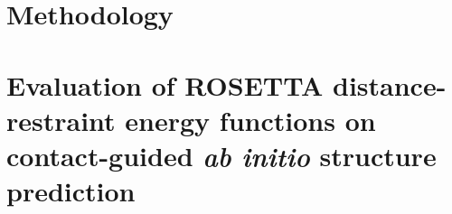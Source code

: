\documentclass[11pt,oneside,leqno,openright]{report}
\begin{document}
% 

% 









\chapter{Methodology}




\chapter{Evaluation of ROSETTA distance-restraint energy functions on contact-guided \textit{ab initio} structure prediction}

\end{document}
